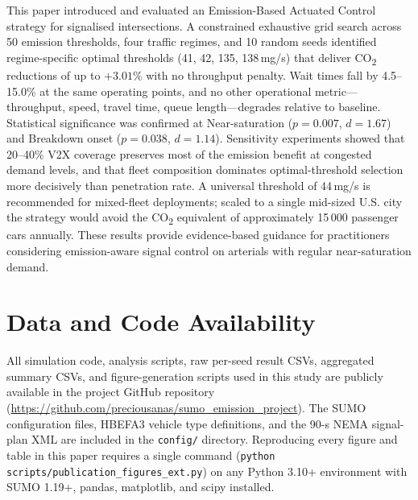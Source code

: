 \documentclass[review,3p,authoryear,times]{elsarticle}
\begin{document}
This paper introduced and evaluated an Emission-Based Actuated Control
strategy for signalised intersections. A constrained exhaustive grid search
across 50 emission thresholds, four traffic regimes, and 10 random seeds
identified regime-specific optimal thresholds (41, 42, 135, 138\,mg/s)
that deliver CO\textsubscript{2} reductions of up to $+3.01\%$ with no
throughput penalty. Wait times fall by 4.5--15.0\% at the same operating
points, and no other operational metric---throughput, speed, travel time,
queue length---degrades relative to baseline. Statistical significance was
confirmed at Near-saturation ($p=0.007$, $d=1.67$) and Breakdown onset
($p=0.038$, $d=1.14$). Sensitivity experiments showed that 20--40\% V2X
coverage preserves most of the emission benefit at congested demand levels,
and that fleet composition dominates optimal-threshold selection more
decisively than penetration rate. A universal threshold of 44\,mg/s is
recommended for mixed-fleet deployments; scaled to a single mid-sized U.S.
city the strategy would avoid the CO\textsubscript{2} equivalent of
approximately 15\,000 passenger cars annually. These results provide
evidence-based guidance for practitioners considering emission-aware signal
control on arterials with regular near-saturation demand.

\section*{Data and Code Availability}
All simulation code, analysis scripts, raw per-seed result CSVs, aggregated
summary CSVs, and figure-generation scripts used in this study are publicly
available in the project GitHub repository
(\url{https://github.com/preciousanas/sumo_emission_project}). The SUMO configuration files, HBEFA3 vehicle type definitions,
and the 90-s NEMA signal-plan XML are included in the \texttt{config/}
directory. Reproducing every figure and table in this paper requires a
single command (\texttt{python scripts/publication\_figures\_ext.py}) on any
Python 3.10+ environment with SUMO 1.19+, pandas, matplotlib, and scipy
installed.
\end{document}

